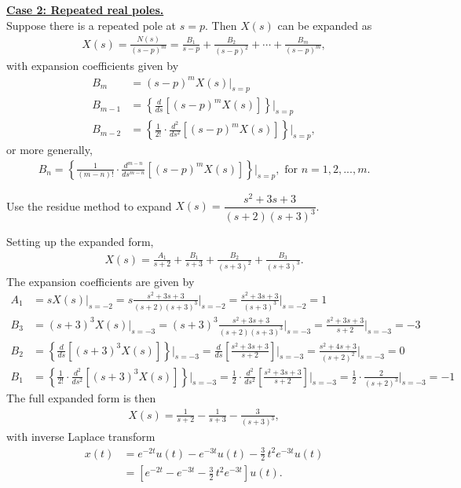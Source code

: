 \documentclass{report}
\begin{document}
\textbf{\underline{Case 2: Repeated real poles.}} \\[0.25cm]
Suppose there is a repeated pole at $s=p$. Then $X(s)$ can be expanded as 
\begin{align}
    X(s) = \frac{N(s)}{(s-p)^m} = \frac{B_1}{s-p} + \frac{B_2}{(s-p)^2} + \cdots + \frac{B_m}{(s-p)^m},
\end{align}
with expansion coefficients given by 
\begin{align}
    B_m &= (s-p)^mX(s)\big|_{s=p} \\ 
    B_{m-1} &= \left\{\frac{d}{ds}\left[(s-p)^mX(s)\right]\right\}\bigg|_{s=p} \\ 
    B_{m-2} &= \left\{\frac{1}{2!}\cdot\frac{d^2}{ds^2}\left[(s-p)^mX(s)\right]\right\}\bigg|_{s=p}, 
\end{align}
or more generally, 
\begin{align}
    B_n = \left\{\frac{1}{(m-n)!}\cdot\frac{d^{m-n}}{ds^{m-n}}\left[(s-p)^mX(s)\right]\right\}\bigg|_{s=p}, \text{ for } n=1,2,...,m.
\end{align}
\begin{example}
    Use the residue method to expand $X(s) = \dfrac{s^2+3s+3}{(s+2)(s+3)^3}$.\\
\end{example}
\begin{solution}
    Setting up the expanded form, 
    \begin{align*}
        X(s) = \frac{A_1}{s+2} + \frac{B_1}{s+3} + \frac{B_2}{(s+3)^2} + \frac{B_3}{(s+3)^3}.
    \end{align*}
    The expansion coefficients are given by 
    \begin{align*}
        A_1 &= sX(s)\big|_{s=-2} = s\frac{s^2+3s+3}{(s+2)(s+3)^3}\bigg|_{s=-2} = \frac{s^2+3s+3}{(s+3)^3}\bigg|_{s=-2} = 1 \\[0.5cm]
        B_3 &= (s+3)^3X(s)\big|_{s=-3} = (s+3)^3\frac{s^2+3s+3}{(s+2)(s+3)^3}\bigg|_{s=-3} = \frac{s^2+3s+3}{s+2}\bigg|_{s=-3} = -3 \\[0.5cm]
        B_2 &= \left\{\frac{d}{ds}[(s+3)^3X(s)]\right\}\bigg|_{s=-3} = \frac{d}{ds}\left[\frac{s^2+3s+3}{s+2}\right]\bigg|_{s=-3} = \frac{s^2+4s+3}{(s+2)^2}\bigg|_{s=-3} = 0 \\[0.5cm]
        B_1 &= \left\{\frac{1}{2!}\cdot\frac{d^2}{ds^2}[(s+3)^3X(s)]\right\}\bigg|_{s=-3} = \frac{1}{2}\cdot\frac{d^2}{ds^2}\left[\frac{s^2+3s+3}{s+2}\right]\bigg|_{s=-3} = \frac{1}{2}\cdot\frac{2}{(s+2)^3}\bigg|_{s=-3} = -1
    \end{align*}
    The full expanded form is then 
    \begin{align*}
        X(s) = \frac{1}{s+2} - \frac{1}{s+3} - \frac{3}{(s+3)^3},
    \end{align*}
    with inverse Laplace transform 
    \begin{align*}
        x(t) &= e^{-2t}u(t) - e^{-3t}u(t) - \frac{3}{2}\,t^2e^{-3t}u(t) \\ 
        &= \left[e^{-2t} - e^{-3t} - \frac{3}{2}\,t^2e^{-3t}\right] u(t).
    \end{align*}
\end{solution}
\end{document}
